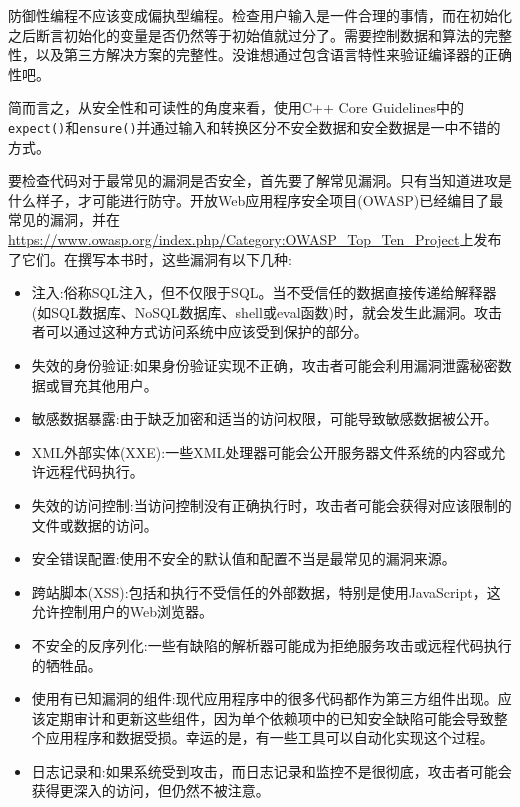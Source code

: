 防御性编程不应该变成偏执型编程。检查用户输入是一件合理的事情，而在初始化之后断言初始化的变量是否仍然等于初始值就过分了。需要控制数据和算法的完整性，以及第三方解决方案的完整性。没谁想通过包含语言特性来验证编译器的正确性吧。

简而言之，从安全性和可读性的角度来看，使用C++ Core Guidelines中的\texttt{expect()}和\texttt{ensure()}并通过输入和转换区分不安全数据和安全数据是一中不错的方式。


要检查代码对于最常见的漏洞是否安全，首先要了解常见漏洞。只有当知道进攻是什么样子，才可能进行防守。开放Web应用程序安全项目(OWASP)已经编目了最常见的漏洞，并在\url{https://www.owasp.org/index.php/Category:OWASP\_Top\_Ten\_Project}上发布了它们。在撰写本书时，这些漏洞有以下几种:

\begin{itemize}
\item 
注入:俗称SQL注入，但不仅限于SQL。当不受信任的数据直接传递给解释器(如SQL数据库、NoSQL数据库、shell或eval函数)时，就会发生此漏洞。攻击者可以通过这种方式访问系统中应该受到保护的部分。

\item 
失效的身份验证:如果身份验证实现不正确，攻击者可能会利用漏洞泄露秘密数据或冒充其他用户。

\item 
敏感数据暴露:由于缺乏加密和适当的访问权限，可能导致敏感数据被公开。

\item 
XML外部实体(XXE):一些XML处理器可能会公开服务器文件系统的内容或允许远程代码执行。

\item 
失效的访问控制:当访问控制没有正确执行时，攻击者可能会获得对应该限制的文件或数据的访问。

\item 
安全错误配置:使用不安全的默认值和配置不当是最常见的漏洞来源。

\item 
跨站脚本(XSS):包括和执行不受信任的外部数据，特别是使用JavaScript，这允许控制用户的Web浏览器。

\item 
不安全的反序列化:一些有缺陷的解析器可能成为拒绝服务攻击或远程代码执行的牺牲品。

\item 
使用有已知漏洞的组件:现代应用程序中的很多代码都作为第三方组件出现。应该定期审计和更新这些组件，因为单个依赖项中的已知安全缺陷可能会导致整个应用程序和数据受损。幸运的是，有一些工具可以自动化实现这个过程。

\item 
日志记录和:如果系统受到攻击，而日志记录和监控不是很彻底，攻击者可能会获得更深入的访问，但仍然不被注意。
\end{itemize}

